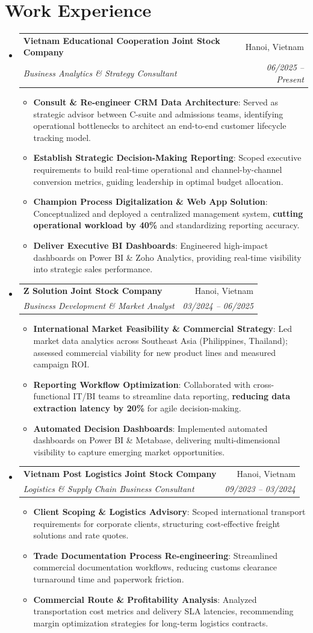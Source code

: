 \documentclass[letterpaper,11pt]{article}
\makeatletter
\newcommand{\resumeItem}[1]{
  \item\small{
    {#1 \vspace{1pt}}
  }
}
\newcommand{\resumeSubheading}[4]{
  \vspace{2pt}\item
    \begin{tabular*}{\textwidth}[t]{l@{\extracolsep{\fill}}r}
      \textbf{#1} & #2 \\
      \textit{\small#3} & \textit{\small #4} \\
    \end{tabular*}\vspace{-2pt}
}
\newcommand{\resumeSubHeadingListStart}{\begin{itemize}[leftmargin=0.15in, label={}]}
\newcommand{\resumeSubHeadingListEnd}{\end{itemize}}
\newcommand{\resumeItemListStart}{\begin{itemize}[leftmargin=0.15in, itemsep=2.5pt, topsep=2pt, parsep=1.5pt]}
\newcommand{\resumeItemListEnd}{\end{itemize}\vspace{2pt}}
\makeatother
\begin{document}
\section*{Work Experience}
  \resumeSubHeadingListStart
        \resumeSubheading
      {Vietnam Educational Cooperation Joint Stock Company}{Hanoi, Vietnam}
      {Business Analytics \& Strategy Consultant}{06/2025 -- Present}
      \resumeItemListStart
      \resumeItem{\textbf{Consult \& Re-engineer CRM Data Architecture}: Served as strategic advisor between C-suite and admissions teams, identifying operational bottlenecks to architect an end-to-end customer lifecycle tracking model.}
      \resumeItem{\textbf{Establish Strategic Decision-Making Reporting}: Scoped executive requirements to build real-time operational and channel-by-channel conversion metrics, guiding leadership in optimal budget allocation.}
      \resumeItem{\textbf{Champion Process Digitalization \& Web App Solution}: Conceptualized and deployed a centralized management system, \textbf{cutting operational workload by 40\%} and standardizing reporting accuracy.}
      \resumeItem{\textbf{Deliver Executive BI Dashboards}: Engineered high-impact dashboards on Power BI \& Zoho Analytics, providing real-time visibility into strategic sales performance.}
      \resumeItemListEnd
    \resumeSubheading
      {Z Solution Joint Stock Company}{Hanoi, Vietnam}
      {Business Development \& Market Analyst}{03/2024 -- 06/2025}
      \resumeItemListStart
      \resumeItem{\textbf{International Market Feasibility \& Commercial Strategy}: Led market data analytics across Southeast Asia (Philippines, Thailand); assessed commercial viability for new product lines and measured campaign ROI.}
      \resumeItem{\textbf{Reporting Workflow Optimization}: Collaborated with cross-functional IT/BI teams to streamline data reporting, \textbf{reducing data extraction latency by 20\%} for agile decision-making.}
      \resumeItem{\textbf{Automated Decision Dashboards}: Implemented automated dashboards on Power BI \& Metabase, delivering multi-dimensional visibility to capture emerging market opportunities.}
      \resumeItemListEnd
    \resumeSubheading
      {Vietnam Post Logistics Joint Stock Company}{Hanoi, Vietnam}
      {Logistics \& Supply Chain Business Consultant}{09/2023 -- 03/2024}
      \resumeItemListStart
      \resumeItem{\textbf{Client Scoping \& Logistics Advisory}: Scoped international transport requirements for corporate clients, structuring cost-effective freight solutions and rate quotes.}
      \resumeItem{\textbf{Trade Documentation Process Re-engineering}: Streamlined commercial documentation workflows, reducing customs clearance turnaround time and paperwork friction.}
      \resumeItem{\textbf{Commercial Route \& Profitability Analysis}: Analyzed transportation cost metrics and delivery SLA latencies, recommending margin optimization strategies for long-term logistics contracts.}
      \resumeItemListEnd
  \resumeSubHeadingListEnd
\end{document}
